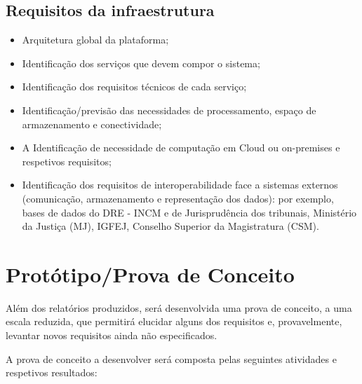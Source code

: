 \subsection{Requisitos da infraestrutura}

\begin{itemize}
\item Arquitetura global da plataforma;
\item Identificação dos serviços que devem compor o sistema;
\item Identificação dos requisitos técnicos de cada serviço;
\item Identificação/previsão das necessidades de processamento, espaço de armazenamento e
conectividade;
\item A Identificação de necessidade de computação em Cloud ou on-premises e respetivos
requisitos;
\item Identificação dos requisitos de interoperabilidade face a sistemas externos (comunicação,
armazenamento e representação dos dados): por exemplo, bases de dados do DRE - INCM e
de Jurisprudência dos tribunais, Ministério da Justiça (MJ), IGFEJ, 
Conselho Superior da Magistratura (CSM).
\end{itemize}


\section{Protótipo/Prova de Conceito}

Além dos relatórios produzidos, será desenvolvida uma prova de conceito, a uma escala
reduzida, que permitirá elucidar alguns dos requisitos e, provavelmente, levantar novos requisitos ainda
não especificados.

A prova de conceito a desenvolver será composta pelas seguintes atividades e respetivos
resultados:

